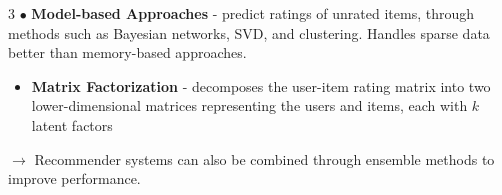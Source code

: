 \documentclass[letterpaper, 10.5pt,landscape]{article}
\makeatletter
\renewcommand{\section}{\@startsection{section}{1}{0mm}%
                                {-1ex plus -.5ex minus -.2ex}%
                                {0.1ex plus .2ex}%
                                {\normalfont\small}}
\makeatother
\begin{document}
\begin{multicols*}{3}
$\bullet$ \textbf{Model-based Approaches} - predict ratings of unrated items, through methods such as Bayesian networks, SVD, and clustering. Handles sparse data better than memory-based approaches.
\begin{itemize}[label={--},leftmargin=4mm]
\vspace{-3pt}
\item \textbf{Matrix Factorization} - decomposes the user-item rating matrix into two lower-dimensional matrices representing the users and items, each with $k$ latent factors
\end{itemize}



$\rightarrow$ Recommender systems can also be combined through ensemble methods to improve performance.




\vspace*{\fill}

\pagebreak







\nocite{LSTM_languageModeling} 
\nocite{LSTMwind}
\nocite{analog-dialogue}
\nocite{deeplearning-ai-nlp}
\nocite{kaggle-nlp-pipelines}
\nocite{bobade2016survey}
\nocite{beakta2015big}
\nocite{edureka-hadoop-questions}
\nocite{edureka-mapreduce-tutorial}


\printbibliography




















\vspace*{\fill}




\end{multicols*}

% 
\end{document}
